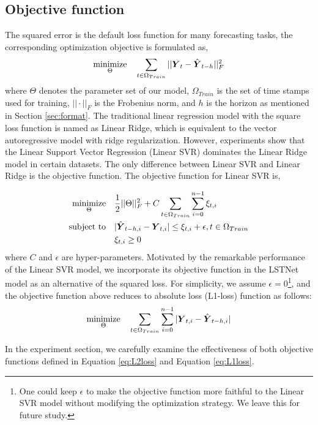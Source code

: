 \subsection{Objective function}
The squared error is the default loss function for many forecasting tasks,
the corresponding optimization objective is formulated as,
\begin{equation}
\mathop{\mathrm{minimize}}_{\Theta}~~~\sum_{t \in \Omega_{Train}} ||{\boldsymbol Y}_t - \hat{{\boldsymbol Y}}_{t-h}||_F^2
\label{eq:L2loss}
\end{equation}
where $\Theta$ denotes the parameter set of our model, $\Omega_{Train}$ is the set of time stamps used for training, $||\cdot||_F$ is the Frobenius norm, and $h$ is the horizon as mentioned in Section \ref{sec:format}.
The traditional linear regression model with the square loss function is named as Linear Ridge, which is equivalent to the vector autoregressive model with ridge regularization. However, experiments show that the Linear Support Vector Regression (Linear SVR) \cite{vapnik1997support} dominates the Linear Ridge model in certain datasets. The only difference between Linear SVR and Linear Ridge is the objective function. The objective function for Linear SVR is,

\begin{equation}
\begin{aligned}
\mathop{\mathrm{minimize}}_{\Theta}~~~&\frac{1}{2}||\Theta||_F^2 + C\sum_{t \in \Omega_{Train}} \sum_{i=0}^{n-1} \xi_{t,i} \\
\mathop{\mathrm{subject\,\,to}}~~~& |\hat{{\boldsymbol Y}}_{t-h,i} - {\boldsymbol Y}_{t,i}| \le \xi_{t,i} + \epsilon, t \in \Omega_{Train} \\
& \xi_{t,i} \ge 0
\end{aligned}
\label{eq:svr}
\end{equation}
where $C$ and $\epsilon$ are hyper-parameters. Motivated by the remarkable performance of the Linear SVR model, we incorporate its objective function in the LSTNet model as an alternative of the squared loss. For simplicity, we assume $\epsilon=0$\footnote{One could keep $\epsilon$ to make the objective function more faithful to the Linear SVR model without modifying the optimization strategy. We leave this for future study.}, and the objective function above reduces to absolute loss (L1-loss) function as follows:
\begin{equation}
\mathop{\mathrm{minimize}}_{\Theta}~~~\sum_{t \in \Omega_{Train}} \sum_{i=0}^{n-1}|{\boldsymbol Y}_{t,i} - \hat{{\boldsymbol Y}}_{t-h,i}|
\label{eq:L1loss}
\end{equation}

In the experiment section, we carefully examine the effectiveness of both objective functions defined in Equation \ref{eq:L2loss} and Equation \ref{eq:L1loss}.

